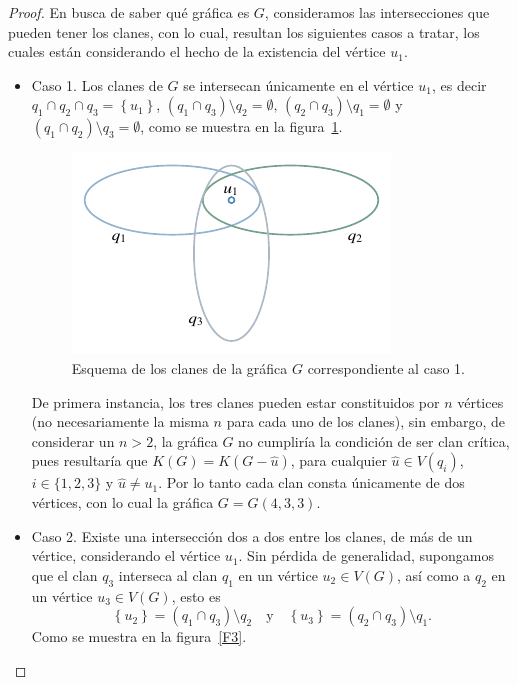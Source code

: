 \documentclass[12pt]{book}
\theoremstyle{definition}
\begin{document}
\begin{proof}
En busca de saber qué gráfica es $G$, consideramos las intersecciones que pueden tener los clanes, con lo cual, resultan los siguientes casos a tratar, los cuales están considerando el hecho de la existencia del vértice $u_1$.
\begin{itemize}
\item Caso 1. 
Los clanes de $G$ se intersecan únicamente en el vértice $u_1$, es decir $q_1\cap q_2\cap q_3=\left\{u_1\right\}$, $(q_1\cap q_3)\setminus q_2=\emptyset  \text{, }(q_2\cap q_3)\setminus q_1=\emptyset$ y $(q_1\cap q_2)\setminus q_3=\emptyset$, como se muestra en la figura~\ref{F2}.

\begin{figure}[!htbp]
	\centering
	\includegraphics[scale=1.2]{Fig1.pdf}
	\caption{Esquema de los clanes de la gráfica $G$ correspondiente al caso 1.\label{F2}}
\end{figure}

De primera instancia, los tres clanes pueden estar constituidos por $n$ vértices (no necesariamente la misma $n$ para cada uno de los clanes), sin embargo, de considerar un $n>2$, la gráfica $G$ no cumpliría la condición de ser clan crítica, pues resultaría que $K(G)=K(G-\hat{u})$, para cualquier $\hat{u}\in V(q_i)$, $i\in\{1,2,3\}$ y $\hat{u}\neq u_1$. Por lo tanto cada clan consta únicamente de dos vértices, con lo cual la gráfica $G=G(4,3,3)$.

\item Caso 2.
Existe una intersección dos a dos entre los clanes, de más de un vértice, considerando el vértice $u_1$. Sin pérdida de generalidad, supongamos que el clan $q_3$ interseca al clan $q_1$ en un vértice $u_2\in V(G)$, así como a $q_2$ en un vértice $u_3\in V(G)$, esto es 
\begin{equation}\label{E1.1}
\left\{u_2\right\}=(q_1\cap q_3)\setminus q_2 \quad \text{y} \quad \left\{u_3\right\}=(q_2\cap q_3)\setminus q_1.
\end{equation}
Como se muestra en la figura~\ref{F3}.


\end{itemize}
\end{proof}
\end{document}
